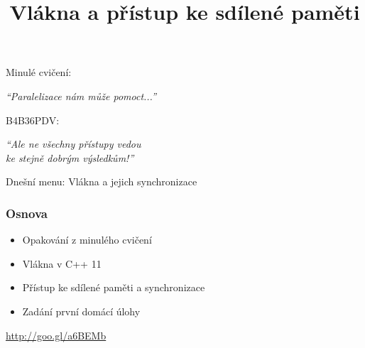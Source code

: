 \documentclass[usenames,dvipsnames,9pt]{beamer}
\title{Vlákna a přístup ke sdílené paměti}
\date{}
\institute{B4B36PDV -- Paralelní a distribuované výpočty}
\begin{document}
\maketitle

\begin{frame}
  Minulé cvičení:
  \vspace{-2.8em}
  \begin{center}
    \Large\emph{``Paralelizace nám může pomoct...''}
  \end{center}
  \pause
  \vspace{1.5em}
  B4B36PDV:
  \vspace{-2.8em}
  \begin{center}
    \Large\emph{``Ale ne všechny přístupy vedou\\ke stejně dobrým výsledkům!''}
  \end{center}
  \pause
  \vspace{2.5em}
  Dnešní menu: \hspace{10pt} \huge Vlákna a jejich synchronizace
\end{frame}

\begin{frame}
  \frametitle{Osnova}
  \begin{itemize}
    \item Opakování z minulého cvičení
    \item Vlákna v C++ 11
    \item Přístup ke sdílené paměti a synchronizace\\[1.5em]
    \item Zadání první domácí úlohy
  \end{itemize}
\end{frame}

%
%

\begin{frame}[standout]
  \url{http://goo.gl/a6BEMb}
\end{frame}
\end{document}
